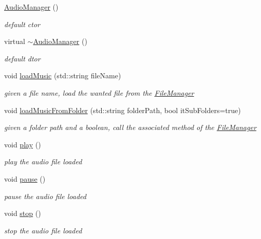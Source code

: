 \begin{DoxyCompactItemize}
\item 
\hyperlink{classAudioManager_ae59d8605c1d706e7bab47d4e8f900d09}{Audio\+Manager} ()
\begin{DoxyCompactList}\small\item\em default ctor \end{DoxyCompactList}\item 
virtual \hyperlink{classAudioManager_ad94dc46723c6d7cf8c81fc3772a842aa}{$\sim$\+Audio\+Manager} ()
\begin{DoxyCompactList}\small\item\em default dtor \end{DoxyCompactList}\item 
void \hyperlink{classAudioManager_a9ccfd245fc3afd6c9679a276c2670ce3}{load\+Music} (std\+::string file\+Name)
\begin{DoxyCompactList}\small\item\em given a file name, load the wanted file from the \hyperlink{classFileManager}{File\+Manager} \end{DoxyCompactList}\item 
void \hyperlink{classAudioManager_a739a57d9db42dda76559f8644701ce2b}{load\+Music\+From\+Folder} (std\+::string folder\+Path, bool it\+Sub\+Folders=true)
\begin{DoxyCompactList}\small\item\em given a folder path and a boolean, call the associated method of the \hyperlink{classFileManager}{File\+Manager} \end{DoxyCompactList}\item 
void \hyperlink{classAudioManager_a0368c3d88f8a10260beee3f7c241e826}{play} ()
\begin{DoxyCompactList}\small\item\em play the audio file loaded \end{DoxyCompactList}\item 
void \hyperlink{classAudioManager_a717679472d89e8cab81defcb217bc797}{pause} ()
\begin{DoxyCompactList}\small\item\em pause the audio file loaded \end{DoxyCompactList}\item 
void \hyperlink{classAudioManager_a9d9d7ef0f5570ab1269ad54358cd3052}{stop} ()
\begin{DoxyCompactList}\small\item\em stop the audio file loaded \end{DoxyCompactList}\item 

\end{DoxyCompactItemize}
